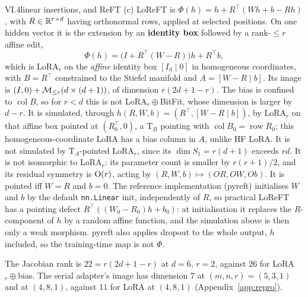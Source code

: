 \begin{proposition}{VI.4}{linear insertions, and ReFT}
(c) LoReFT \citep{wu2024reft} is $\Phi(h)=h+R^\top(Wh+b-Rh)$, with $R\in\mathbb{R}^{r\times d}$ having orthonormal rows, applied
at selected positions. On one hidden vector it is the extension by an \textbf{identity box} followed by a rank-$\le r$
affine edit,
\[\Phi(h)=\big(I+R^\top(W-R)\big)h+R^\top b,\]
which is LoRA$_r$ on the \emph{affine} identity box $[I_d\mid0]$ in homogeneous coordinates, with $B=R^\top$ constrained
to the Stiefel manifold and $A=[W-R\mid b]$. Its image is $(I,0)+\mathcal{M}_{\le r}(d\times(d+1))$, of dimension $r(2d+1-r)$.
The bias is confined to $\operatorname{col}B$, so for $r<d$ this is not LoRA$_r{}\oplus{}$BitFit, whose dimension is larger
by $d-r$. It is simulated, through $h(R,W,b)=(R^\top,[W-R\mid b])$, by LoRA$_r$ on that affine box pointed at
$(R_0^\top,0)$, a $\mathrm T_B$ pointing with $\operatorname{col}B_0=\operatorname{row}R_0$; this homogeneous-coordinate
LoRA has a bias column in $A$, unlike HF LoRA. It is not simulated by $\mathrm T_A$-pointed LoRA$_r$, since its
$\dim S_1=r(d+1)$ exceeds $rd$. It is not isomorphic to LoRA$_r$: its parameter count is smaller by $r(r+1)/2$, and its
residual symmetry is $\mathrm{O}(r)$, acting by $(R,W,b)\mapsto(OR,OW,Ob)$. It is pointed iff $W=R$ and $b=0$. The reference
implementation (pyreft) initialises $W$ and $b$ by the default \texttt{nn.Linear} init, independently of $R$, so
practical LoReFT has a pointing defect $R^\top((W_0-R_0)h+b_0)$: at initialisation it replaces the $R$-component of $h$
by a random affine function, and the simulation above is then only a weak morphism. pyreft also applies dropout to the
whole output, $h$ included, so the training-time map is not $\Phi$.
\end{proposition}

\noindent{}\enspace The Jacobian rank is $22=r(2d+1-r)$ at $d=6$, $r=2$, against $26$ for
LoRA$_r{}\oplus{}$bias. The serial adapter's image has dimension $7$ at $(m,n,r)=(5,3,1)$ and at $(4,8,1)$, against $11$
for LoRA at $(4,8,1)$ (Appendix~\ref{app:repro}).

